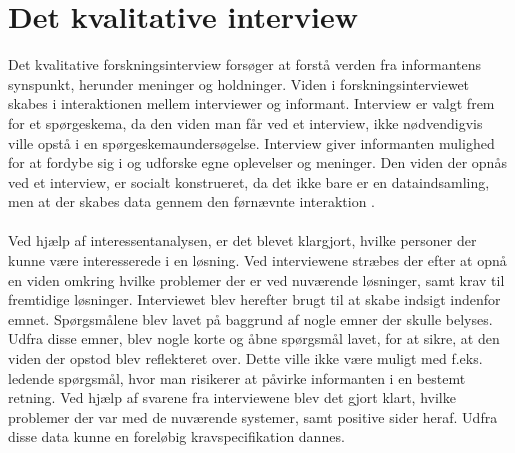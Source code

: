 \section{Det kvalitative interview}
Det kvalitative forskningsinterview forsøger at forstå verden fra informantens synspunkt, herunder meninger og holdninger. Viden i forskningsinterviewet skabes i interaktionen mellem interviewer og informant. Interview er valgt frem for et spørgeskema, da den viden man får ved et interview, ikke nødvendigvis ville opstå i en spørgeskemaundersøgelse. Interview giver informanten mulighed for at fordybe sig i og udforske egne oplevelser og meninger. Den viden der opnås ved et interview, er socialt konstrueret, da det ikke bare er en dataindsamling, men at der skabes data gennem den førnævnte interaktion \citep{kvale2009}.
\\\\
Ved hjælp af interessentanalysen, er det blevet klargjort, hvilke personer der kunne være interesserede i en løsning. Ved interviewene stræbes der efter at opnå en viden omkring hvilke problemer der er ved nuværende løsninger, samt krav til fremtidige løsninger. Interviewet blev herefter brugt til at skabe indsigt indenfor emnet. Spørgsmålene blev lavet på baggrund af nogle emner der skulle belyses. Udfra disse emner, blev nogle korte og åbne spørgsmål lavet, for at sikre, at den viden der opstod blev reflekteret over. Dette ville ikke være muligt med f.eks. ledende spørgsmål, hvor man risikerer at påvirke informanten i en bestemt retning. Ved hjælp af svarene fra interviewene blev det gjort klart, hvilke problemer der var med de nuværende systemer, samt positive sider heraf. Udfra disse data kunne en foreløbig kravspecifikation dannes.
\\

